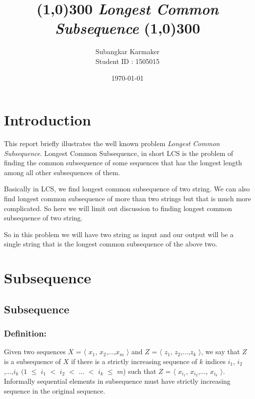 \documentclass{report}
\title{
    \line(1,0){300}
    \endgraf\bigskip
    \Huge
    \emph{Longest Common Subsequence}
    \newline
    \line(1,0){300}
    \bigskip
    \bigskip
    }
\author{
    \Large{Subangkar Karmaker}\\
    \Large{Student ID : 1505015}
    }
\date{
    \endgraf\bigskip
    \Large{\today}
    }
\begin{document}
    
    \maketitle
    \renewcommand{\familydefault}{\sfdefault}
    
    \tableofcontents
    
    \chapter{Introduction}
    This report briefly illustrates the well known problem \textit{Longest Common Subsequence}. Longest Common Subsequence, in short LCS is the problem of finding the common subsequence of some sequences that has the longest length among all other subsequences of them.
    
    \bigskip
    Basically in LCS, we find longest common subsequence of two string. We can also find longest common subsequence of more than two strings but that is much more complicated. So here we will limit out discussion to finding longest common subsequence of two string.
    
    \bigskip
    So in this problem we will have two string as input and our output will be a single string that is the longest common subsequence of the above two.  
    \newpage
    
    
    \chapter{Subsequence}{\label{chap:subseq}}
    \section{Subsequence}{
    \bigskip
    \subsection{Definition:}
    Given two sequences $X$ = $\langle$ $x_1$, $x_2$,...,$x_m$ $\rangle$ and $Z$  = $\langle$ $z_1$, $z_2$,...,$z_k$ $\rangle$, we say that $Z$ is a subsequence of $X$ if there is a strictly increasing sequence of $k$ indices $i_1$, $i_2$,...,$i_k$  $(1$ $\leq$ $i_1$ $<$ $i_2$ $<$ ... $<$ $i_k$ $\leq$ $m$) such that $Z$ = $\langle$ $x_{i_1}$, $x_{i_2}$,..., $x_{i_k}$ $\rangle$.\\
    
    Informally sequential elements in subsequence must have strictly increasing sequence in the original sequence.
    \bigskip
    }
    
\end{document}
